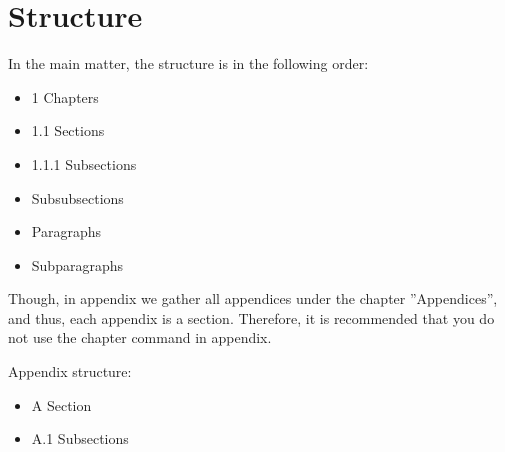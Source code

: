 \section{Structure}
\label{appendix:structure}

In the main matter, the structure is in the following order:

\begin{itemize}
    \item 1 Chapters
    \item 1.1 Sections
    \item 1.1.1 Subsections
    \item Subsubsections
    \item Paragraphs
    \item Subparagraphs
\end{itemize}

Though, in appendix we gather all appendices under the chapter ''Appendices'', and thus, each appendix is a section. Therefore, it is recommended that you do not use the chapter command in appendix.

Appendix structure:

\begin{itemize}
    \item A Section
    \item A.1 Subsections
\end{itemize}
